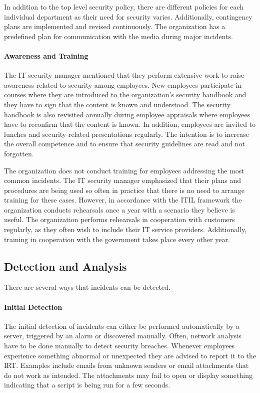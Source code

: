In addition to the top level security policy, there are different policies for each individual department as their need for security varies. Additionally, contingency plans are implemented and revised continuously. The organization has a predefined plan for communication with the media during major incidents. 

\paragraph{Awareness and Training}
The IT security manager mentioned that they perform extensive work to raise awareness related to security among employees. New employees participate in courses where they are introduced to the organization's security handbook and they have to sign that the content is known and understood. The security handbook is also revisited annually during employee appraisals where employees have to reconfirm that the content is known. In addition, employees are invited to lunches and security-related presentations regularly. The intention is to increase the overall competence and to ensure that security guidelines are read and not forgotten.

The organization does not conduct training for employees addressing the most common incidents. The IT security manager emphasized that their plans and procedures are being used so often in practice that there is no need to arrange training for these cases. However, in accordance with the ITIL framework the organization conducts rehearsals once a year with a scenario they believe is useful. The organization performs rehearsals in cooperation with customers regularly, as they often wish to include their IT service providers. Additionally, training in cooperation with the government takes place every other year. 

\subsection{Detection and Analysis}
There are several ways that incidents can be detected.
\paragraph{Initial Detection}
The initial detection of incidents can either be performed automatically by a server, triggered by an alarm or discovered manually. Often, network analysis have to be done manually to detect security breaches. Whenever employees experience something abnormal or unexpected they are advised to report it to the \ac{IRT}. Examples include emails from unknown senders or email attachments that do not work as intended. The attachments may fail to open or display something indicating that a script is being run for a few seconds.

